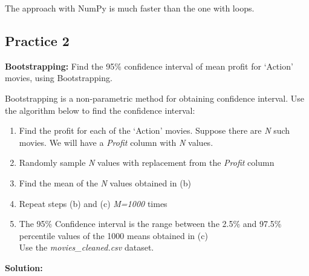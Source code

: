 \documentclass[
  letterpaper,
  DIV=11,
  numbers=noendperiod]{scrreprt}
\providecommand{\tightlist}{%
  \setlength{\itemsep}{0pt}\setlength{\parskip}{0pt}}\usepackage{longtable,booktabs,array}
\begin{document}
The approach with NumPy is much faster than the one with loops.

\hypertarget{practice-2-1}{%
\subsection{Practice 2}\label{practice-2-1}}

\textbf{Bootstrapping:} Find the 95\% confidence interval of mean profit
for `Action' movies, using Bootstrapping.

Bootstrapping is a non-parametric method for obtaining confidence
interval. Use the algorithm below to find the confidence interval:

\begin{enumerate}
\def\labelenumi{\arabic{enumi}.}
\tightlist
\item
  Find the profit for each of the `Action' movies. Suppose there are
  \emph{N} such movies. We will have a \emph{Profit} column with
  \emph{N} values.\\
\item
  Randomly sample \emph{N} values with replacement from the
  \emph{Profit} column\\
\item
  Find the mean of the \emph{N} values obtained in (b)\\
\item
  Repeat steps (b) and (c) \emph{M=1000} times\\
\item
  The 95\% Confidence interval is the range between the 2.5\% and 97.5\%
  percentile values of the 1000 means obtained in (c)\\
  Use the \emph{movies\_cleaned.csv} dataset.
\end{enumerate}

\textbf{Solution:}
\end{document}
